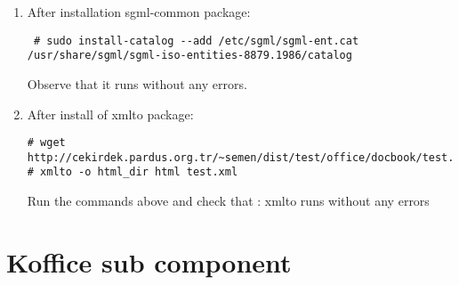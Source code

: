 \documentclass[a4paper,10pt]{article}
\begin{document}
\begin{enumerate}
\item After installation sgml-common package:
\begin{verbatim}
 # sudo install-catalog --add /etc/sgml/sgml-ent.cat /usr/share/sgml/sgml-iso-entities-8879.1986/catalog
\end{verbatim}

Observe that it runs without any errors.
\item After install of xmlto package:

\begin{verbatim}
# wget http://cekirdek.pardus.org.tr/~semen/dist/test/office/docbook/test.xml
# xmlto -o html_dir html test.xml
\end{verbatim}

Run the commands above and check that : xmlto runs without any errors
\end{enumerate}
\section{Koffice sub component}
\end{document}
